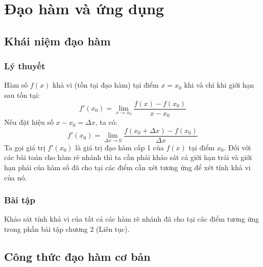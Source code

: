 \chapter{Đạo hàm và ứng dụng}
\section{Khái niệm đạo hàm}
\subsection{Lý thuyết}
Hàm số $f(x)$ khả vi (tồn tại đạo hàm) tại điểm $x=x_{0}$ khi và chỉ khi giới hạn sau tồn tại:
\begin{equation} \label{eq:seventh}
f'(x_{0})=\lim_{x\to x_{0}}\frac{f(x)-f(x_{0})}{x-x_{0}}
\end{equation}
Nếu đặt hiệu số $x-x_{0}=\Delta x$, ta có:
\begin{equation} \label{eq:eighth}
    f'(x_{0})=\lim_{\Delta x\to0}\frac{f(x_{0}+\Delta x)-f(x_{0})}{\Delta x}
\end{equation}
Ta gọi giá trị $f'(x_{0})$ là giá trị đạo hàm cấp 1 của $f(x)$ tại điểm $x_{0}$.
Đối với các bài toán cho hàm rẽ nhánh thì ta cần phải khảo sát cả giới hạn trái và giới hạn phải của hàm số đã cho tại các điểm cần xét tương ứng để xét tính khả vi của nó.
\subsection{Bài tập}
Khảo sát tính khả vi của tất cả các hàm rẽ nhánh đã cho tại các điểm tương ứng trong phần bài tập chương 2 (Liên tục).
\section{Công thức đạo hàm cơ bản}
